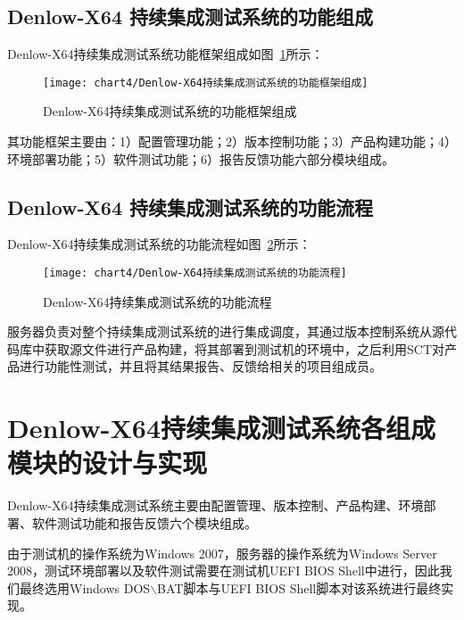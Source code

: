 	\subsection{Denlow-X64 持续集成测试系统的功能组成}
		
		Denlow-X64持续集成测试系统功能框架组成如图~\ref{fig:Denlow-X64持续集成测试系统的功能框架组成}所示：
		
		\begin{figure}[H] %
			\centering
			\texttt{[image: chart4/Denlow-X64持续集成测试系统的功能框架组成]}
			\caption{Denlow-X64持续集成测试系统的功能框架组成}
			\label{fig:Denlow-X64持续集成测试系统的功能框架组成}
		\end{figure}
		
		其功能框架主要由：1）配置管理功能；2）版本控制功能；3）产品构建功能；4）环境部署功能；5）软件测试功能；6）报告反馈功能六部分模块组成。
	
	\subsection{Denlow-X64 持续集成测试系统的功能流程}
		
		Denlow-X64持续集成测试系统的功能流程如图~\ref{fig:Denlow-X64持续集成测试系统的功能流程}所示：
		
		\begin{figure}[H] %
			\centering
			\texttt{[image: chart4/Denlow-X64持续集成测试系统的功能流程]}
			\caption{Denlow-X64持续集成测试系统的功能流程}
			\label{fig:Denlow-X64持续集成测试系统的功能流程}
		\end{figure}
		
		服务器负责对整个持续集成测试系统的进行集成调度，其通过版本控制系统从源代码库中获取源文件进行产品构建，将其部署到测试机的环境中，之后利用SCT对产品进行功能性测试，并且将其结果报告、反馈给相关的项目组成员。 

\section{Denlow-X64持续集成测试系统各组成模块的设计与实现}
	
	Denlow-X64持续集成测试系统主要由配置管理、版本控制、产品构建、环境部署、软件测试功能和报告反馈六个模块组成。
	
	由于测试机的操作系统为Windows 2007，服务器的操作系统为Windows Server 2008，测试环境部署以及软件测试需要在测试机UEFI BIOS Shell中进行，因此我们最终选用Windows DOS$\backslash$BAT脚本与UEFI BIOS Shell脚本对该系统进行最终实现。
	
